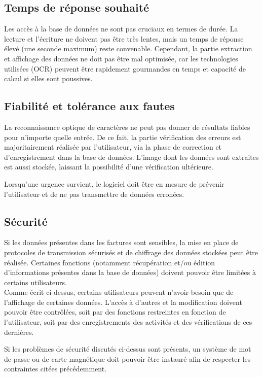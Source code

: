 \subsection{Temps de réponse souhaité}
Les accès à la base de données ne sont pas cruciaux en termes de durée. La lecture et l’écriture ne doivent pas être très lentes, mais un temps de réponse élevé (une seconde 
maximum) reste convenable. Cependant, la partie extraction et affichage des données ne 
doit pas être mal optimisée, car les technologies utilisées (OCR) peuvent être rapidement gourmandes en temps et capacité de calcul si elles sont poussives.

\subsection{Fiabilité et tolérance aux fautes}
La reconnaissance optique de caractères ne peut pas donner de résultats fiables pour n’importe quelle entrée. De ce fait, la partie vérification des erreurs est majoritairement réalisée par l’utilisateur, via la phase de correction et d’enregistrement dans la base de données. L’image dont les données sont extraites est aussi stockée, laissant la possibilité d’une vérification ultérieure.

Lorsqu’une urgence survient, le logiciel doit être en mesure de prévenir l’utilisateur et de ne pas transmettre de données erronées. 

\subsection{Sécurité}
Si les données présentes dans les factures sont sensibles, la mise en place de protocoles de transmission sécurisés et de chiffrage des données stockées peut être réalisée.
Certaines fonctions (notamment récupération et/ou édition d’informations présentes dans la base de données) doivent pouvoir être limitées à certains utilisateurs.\\

Comme écrit ci-dessus, certains utilisateurs peuvent n’avoir besoin que de l’affichage de certaines données. L’accès à d’autres et la modification doivent pouvoir être contrôlées, soit par des fonctions restreintes en fonction de l'utilisateur, soit par des enregistrements des activités et des vérifications de ces dernières.

Si les problèmes de sécurité discutés ci-dessus sont présents, un système de mot de passe ou de carte magnétique doit pouvoir être instauré afin de respecter les contraintes citées précédemment.

